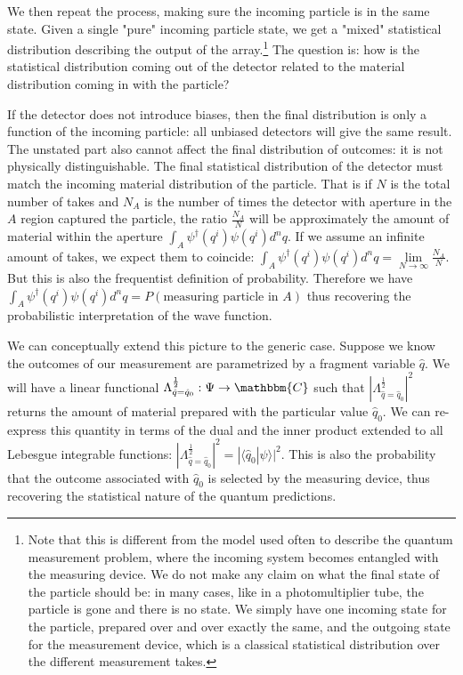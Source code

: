 \documentclass[aps,pra,10pt,twocolumn,floatfix,nofootinbib]{revtex4-1}
\numberwithin{equation}{section}
\theoremstyle{definition}
\begin{document}
We then repeat the process, making sure the incoming particle is in the same state. Given a single "pure" incoming particle state, we get a "mixed" statistical distribution describing the output of the array.\footnote{Note that this is different from the model used often to describe the quantum measurement problem, where the incoming system becomes entangled with the measuring device. We do not make any claim on what the final state of the particle should be: in many cases, like in a photomultiplier tube, the particle is gone and there is no state. We simply have one incoming state for the particle, prepared over and over exactly the same, and the outgoing state for the measurement device, which is a classical statistical distribution over the different measurement takes.} The question is: how is the statistical distribution coming out of the detector related to the material distribution coming in with the particle?

If the detector does not introduce biases, then the final distribution is only a function of the incoming particle: all unbiased detectors will give the same result. The unstated part also cannot affect the final distribution of outcomes: it is not physically distinguishable. The final statistical distribution of the detector must match the incoming material distribution of the particle. That is if $N$ is the total number of takes and $N_A$ is the number of times the detector with aperture in the $A$ region captured the particle, the ratio $\frac{N_A}{N}$ will be approximately the amount of material within the aperture $\int_A \psi^\dagger(q^i) \psi(q^i) d^nq$. If we assume an infinite amount of takes, we expect them to coincide: $\int_A \psi^\dagger(q^i) \psi(q^i) d^nq = \lim\limits_{N\rightarrow\infty} \frac{N_A}{N}$. But this is also the frequentist definition of probability. Therefore we have $\int_A \psi^\dagger(q^i) \psi(q^i) d^nq = P(\textrm{measuring particle in } A)$ thus recovering the probabilistic interpretation of the wave function.

We can conceptually extend this picture to the generic case. Suppose we know the outcomes of our measurement are parametrized by a fragment variable $\hat{q}$. We will have a linear functional $\Lambda^{\frac{1}{2}}_{\hat{q}=\hat{q}_0} : \Psi \rightarrow \mathbbm{C}$ such that $|\Lambda^{\frac{1}{2}}_{\hat{q}=\hat{q}_0}|^2$ returns the amount of material prepared with the particular value $\hat{q}_0$. We can re-express this quantity in terms of the dual and the inner product extended to all Lebesgue integrable functions: $|\Lambda^{\frac{1}{2}}_{\hat{q}=\hat{q}_0}|^2 = |\langle \hat{q}_0 | \psi \rangle|^2 $. This is also the probability that the outcome associated with $\hat{q}_0$ is selected by the measuring device, thus recovering the statistical nature of the quantum predictions. 
\end{document}
